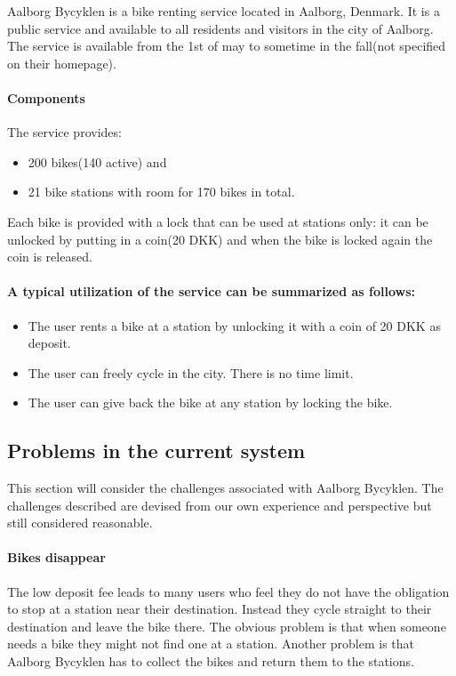 \label{aalborg_bycyklen}
Aalborg Bycyklen is a bike renting service located in Aalborg, Denmark.
It is a public service and available to all residents and visitors in the city of Aalborg.
The service is available from the 1st of may to sometime in the fall(not specified on their homepage).\cite{aalborgbycyklenbagcyklen}


\paragraph{Components}
The service provides:
\begin{itemize}
\item 200 bikes(140 active) and 
\item 21 bike stations with room for 170 bikes in total.
\end{itemize}
Each bike is provided with a lock that can be used at stations only:
it can be unlocked by putting in a coin(20 DKK) and when the bike is locked again the coin is released.

\paragraph{A typical utilization of the service can be summarized as follows:}
\begin{itemize}
\item The user rents a bike at a station by unlocking it with a coin of 20 DKK as deposit.
\item The user can freely cycle in the city. There is no time limit.
\item The user can give back the bike at any station by locking the bike.
\end{itemize}

\subsection{Problems in the current system}\label{aalborg_bycyklen:challenges}
This section will consider the challenges associated with Aalborg Bycyklen.
The challenges described are devised from our own experience and perspective but still considered reasonable.

\paragraph{Bikes disappear}
The low deposit fee leads to many users who feel they do not have the obligation to stop at a station near their destination.
Instead they cycle straight to their destination and leave the bike there.
The obvious problem is that when someone needs a bike they might not find one at a station.
Another problem is that Aalborg Bycyklen has to collect the bikes and return them to the stations.

